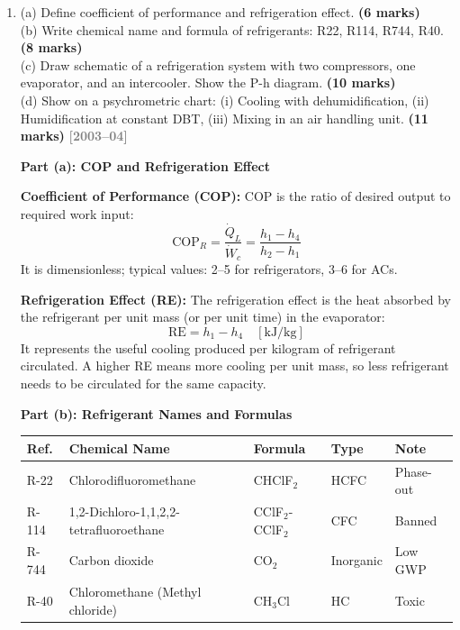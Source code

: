 \documentclass[12pt,a3paper]{article}
\newcommand{\yr}[1]{\hfill\textcolor{gray}{\small\textbf{[#1]}}}
\newcommand{\mk}[1]{\textcolor{orange!70!black}{\small\textbf{(#1 marks)}}}
\begin{document}
\begin{enumerate}
\begin{tcolorbox}[enhanced,breakable,ansbox,colback=cC!4,colframe=cC,
  boxrule=0.8pt,arc=5pt,
  title={\textbf{Answer}},fonttitle=\bfseries\color{white},colbacktitle=cC]
\textbf{In tons of refrigeration:}
\[
  \dot{Q} = \frac{11.63}{3.517} \approx \boxed{3.31\,\text{TR}}
\]

\end{tcolorbox}


\item \label{qlabel:A3-Q33}
(a) Define coefficient of performance and refrigeration effect. \mk{6}\\
(b) Write chemical name and formula of refrigerants: R22, R114, R744, R40. \mk{8}\\
(c) Draw schematic of a refrigeration system with two compressors, one evaporator, and an intercooler. Show the P-h diagram. \mk{10}\\
(d) Show on a psychrometric chart: (i) Cooling with dehumidification, (ii) Humidification at constant DBT, (iii) Mixing in an air handling unit. \mk{11}
\yr{2003--04}


\begin{tcolorbox}[enhanced,breakable,ansbox,colback=cC!4,colframe=cC,
  boxrule=0.8pt,arc=5pt,
  title={\textbf{Answer}},fonttitle=\bfseries\color{white},colbacktitle=cC]

\textbf{Part (a): COP and Refrigeration Effect}

\textbf{Coefficient of Performance (COP):}
COP is the ratio of desired output to required work input:
\[
  \text{COP}_R = \frac{\dot{Q}_L}{\dot{W}_c}
  = \frac{h_1 - h_4}{h_2 - h_1}
\]
It is dimensionless; typical values: 2--5 for refrigerators, 3--6 for ACs.

\textbf{Refrigeration Effect (RE):}
The refrigeration effect is the heat absorbed by the refrigerant per unit
mass (or per unit time) in the evaporator:
\[
  \text{RE} = h_1 - h_4 \quad [\text{kJ/kg}]
\]
It represents the useful cooling produced per kilogram of refrigerant
circulated. A higher RE means more cooling per unit mass, so less refrigerant
needs to be circulated for the same capacity.

\hrulefill

\textbf{Part (b): Refrigerant Names and Formulas}

\begin{center}
\small
\begin{tabular}{@{}lllll@{}}
\toprule
\textbf{Ref.} & \textbf{Chemical Name}                  & \textbf{Formula}     & \textbf{Type} & \textbf{Note} \\
\midrule
R-22  & Chlorodifluoromethane                    & CHClF$_2$            & HCFC  & Phase-out \\
R-114 & 1,2-Dichloro-1,1,2,2-tetrafluoroethane  & CClF$_2$-CClF$_2$    & CFC   & Banned \\
R-744 & Carbon dioxide                           & CO$_2$               & Inorganic & Low GWP \\
R-40  & Chloromethane (Methyl chloride)          & CH$_3$Cl             & HC    & Toxic \\
\bottomrule
\end{tabular}
\end{center}


\end{tcolorbox}
\end{enumerate}
\end{document}
